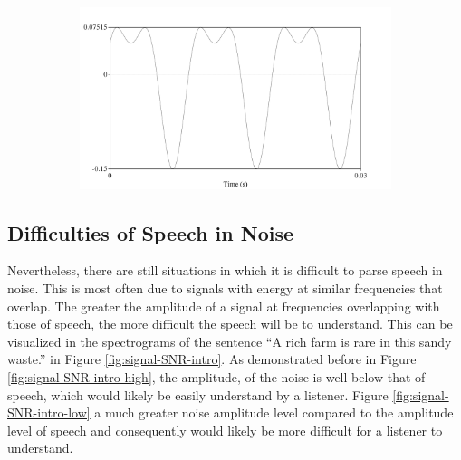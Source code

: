 \begin{figure}[H]
\begin{center}
\begin{subfigure}{0.5\textwidth}
  \includegraphics[width=\textwidth]{figure/sound-combined-shifted-phase.png}
  \caption{}
  \label{fig:sound-combined-shifted-phase}
\end{subfigure}
\end{center}
\caption{}
\label{fig:sound-shifted-phase}
\end{figure}



\DIFaddend \subsection{Difficulties of Speech in Noise}\label{sec:snr-difficult}

Nevertheless, there are still situations in which it is difficult to parse speech in noise.  This is most often due to signals with energy at similar frequencies that overlap.  The greater the amplitude of a signal at frequencies overlapping with those of speech, the more difficult the speech will be to understand.  This can be visualized in the spectrograms of the sentence ``A rich farm is rare in this sandy waste.'' in Figure \ref{fig:signal-SNR-intro}.  As demonstrated before in Figure \ref{fig:signal-SNR-intro-high}, the amplitude, \DIFdelbegin {}\DIFdelend of the noise is well below that of speech, which would likely be easily understand by a listener.  Figure \ref{fig:signal-SNR-intro-low} \DIFdelbegin {}\DIFdelend \DIFaddbegin {}\DIFaddend a much greater noise amplitude level compared to the amplitude level of speech and consequently would likely be more difficult for a listener to understand.

